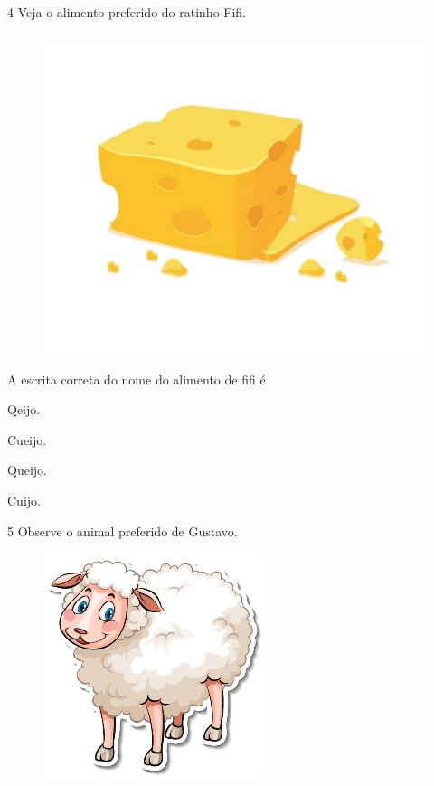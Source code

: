 \num{4} Veja o alimento preferido do ratinho Fifi.

\begin{figure}[htpb!]
\centering
\includegraphics[width=.5\textwidth]{media/image141.jpeg}
\end{figure}


A escrita correta do nome do alimento de fifi é

\begin{multicols}{2}
\begin{escolha}
\item Qeijo.

\item Cueijo.

\item Queijo.

\item Cuijo.
\end{escolha}
\end{multicols}

\pagebreak
\num{5} Observe o animal preferido de Gustavo.

\begin{figure}[htpb!]
\centering
\includegraphics[width=.4\textwidth]{media/image142.jpeg}
\end{figure}

